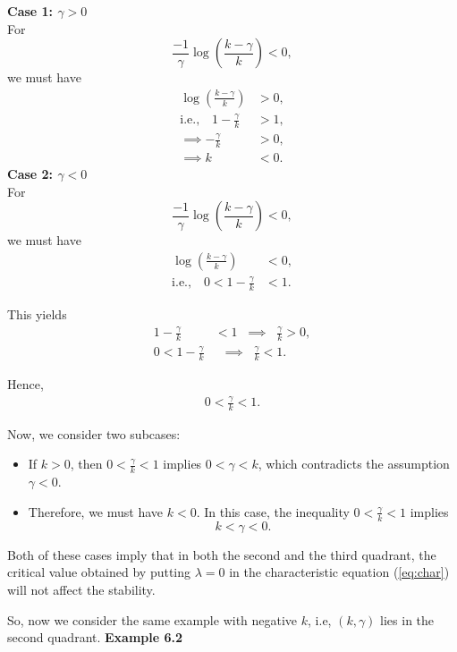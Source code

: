 \documentclass[11pt]{article}
\theoremstyle{remark}
\begin{document}
\textbf{Case 1: $\gamma>0$}\\
For 
\[
\frac{-1}{\gamma}\log\!\left(\frac{k - \gamma}{k}\right) < 0,
\]
we must have
\begin{align}
	\log\!\left(\frac{k - \gamma}{k}\right) &> 0,\nonumber\\[0.5em]
	\text{i.e.,} \quad 1 - \frac{\gamma}{k} &> 1, \nonumber\\[0.5em]
	\implies -\frac{\gamma}{k} &> 0, \nonumber\\[0.5em]
	\implies k &< 0. \nonumber
\end{align}
\textbf{Case 2: $\gamma<0$}\\

For 
\[
\frac{-1}{\gamma}\log\!\left(\frac{k - \gamma}{k}\right) < 0,
\]
we must have
\begin{align}
	\log\!\left(\frac{k - \gamma}{k}\right) &< 0, \nonumber\\[0.5em]
	\text{i.e.,} \quad 0 < 1 - \frac{\gamma}{k} &< 1. \nonumber
\end{align}

This yields
\begin{align}
	1 - \frac{\gamma}{k} &< 1 \;\;\implies\;\; \frac{\gamma}{k} > 0, \nonumber\\[0.5em]
	0 < 1 - \frac{\gamma}{k} &\;\;\implies\;\; \frac{\gamma}{k} < 1. \nonumber
\end{align}

Hence,
\begin{align}
	0 < \frac{\gamma}{k} < 1. \nonumber
\end{align}

Now, we consider two subcases:

\begin{itemize}
	\item If $k > 0$, then $0 < \frac{\gamma}{k} < 1$ implies $0 < \gamma < k$, which contradicts the assumption $\gamma < 0$.
	
	\item Therefore, we must have $k < 0$. In this case, the inequality $0 < \frac{\gamma}{k} < 1$ implies
	\[
	k < \gamma < 0.
	\]
\end{itemize}
	
	Both of these cases imply that in both the second and the third quadrant, the critical value obtained by putting $\lambda=0$ in the characteristic equation (\ref{eq:char}) will not affect the stability.
	
	So, now we consider the same example with negative $k$, i.e, $(k,\gamma)$ lies in the second quadrant.
	\textbf{Example 6.2}
	
\end{document}
